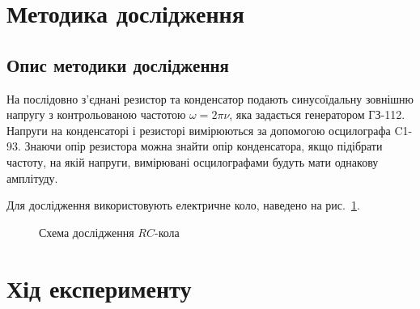 \section{Методика дослідження}

\subsection{Опис методики дослідження}

На послідовно з'єднані резистор та конденсатор подають синусоїдальну зовнішню напругу з контрольованою частотою $\omega = 2\pi \nu$, яка задається генератором ГЗ-112. Напруги на конденсаторі і резисторі вимірюються за допомогою  осцилографа C1-93. Знаючи опір резистора можна знайти опір конденсатора, якщо підібрати частоту, на якій напруги, вимірювані осцилографами будуть мати однакову амплітуду.

Для дослідження використовують електричне коло, наведено на рис.~\ref{pic:RC_circuit}.

\begin{figure}[h!]\centering
        
		\caption{Схема дослідження $RC$-кола}
		\label{pic:RC_circuit}
\end{figure}


\section{Хід експерименту}


